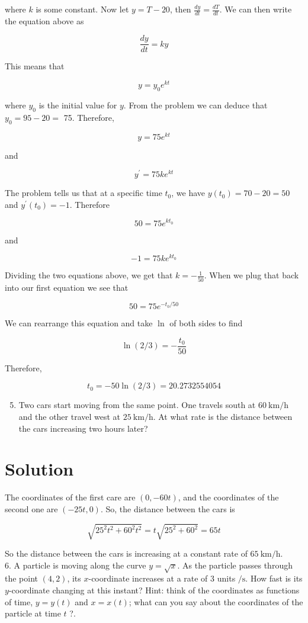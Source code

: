 \documentclass[10pt]{article}
\begin{document}
where $k$ is some constant. Now let $y=T-20$, then $\frac{d y}{d t}=\frac{d T}{d t}$. We can then write the equation above as

$$
\frac{d y}{d t}=k y
$$

This means that

$$
y=y_{0} e^{k t}
$$

where $y_{0}$ is the initial value for $y$. From the problem we can deduce that $y_{0}=95-20=$ 75. Therefore,

$$
y=75 e^{k t}
$$

and

$$
y^{\prime}=75 k e^{k t}
$$

The problem tells us that at a specific time $t_{0}$, we have $y\left(t_{0}\right)=70-20=50$ and $y^{\prime}\left(t_{0}\right)=-1$. Therefore

$$
50=75 e^{k t_{0}}
$$

and

$$
-1=75 k e^{k t_{0}}
$$

Dividing the two equations above, we get that $k=-\frac{1}{50}$. When we plug that back into our first equation we see that

$$
50=75 e^{-t_{0} / 50}
$$

We can rearrange this equation and take $\ln$ of both sides to find

$$
\ln (2 / 3)=-\frac{t_{0}}{50}
$$

Therefore,

$$
t_{0}=-50 \ln (2 / 3)=20.2732554054
$$

\begin{enumerate}
  \setcounter{enumi}{4}
  \item Two cars start moving from the same point. One travels south at $60 \mathrm{~km} / \mathrm{h}$ and the other travel west at $25 \mathrm{~km} / \mathrm{h}$. At what rate is the distance between the cars increasing two hours later?
\end{enumerate}

\section*{Solution}
The coordinates of the first care are $(0,-60 t)$, and the coordinates of the second one are $(-25 t, 0)$. So, the distance between the cars is

$$
\sqrt{25^{2} t^{2}+60^{2} t^{2}}=t \sqrt{25^{2}+60^{2}}=65 t
$$

So the distance between the cars is increasing at a constant rate of $65 \mathrm{~km} / \mathrm{h}$.\\
6. A particle is moving along the curve $y=\sqrt{x}$. As the particle passes through the point $(4,2)$, its $x$-coordinate increases at a rate of 3 units $/ \mathrm{s}$. How fast is its $y$-coordinate changing at this instant? Hint: think of the coordinates as functions of time, $y=y(t)$ and $x=x(t)$; what can you say about the coordinates of the particle at time $t$ ?.
\end{document}
